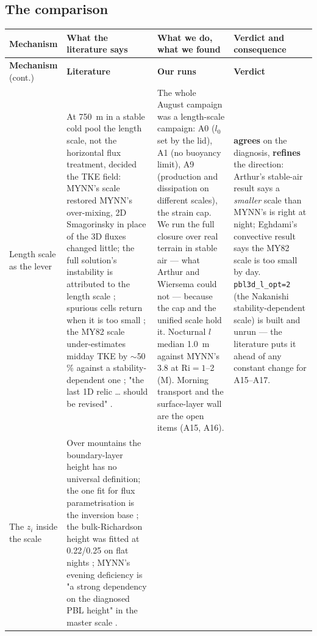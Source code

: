 \documentclass[10pt,a4paper]{article}
\newcommand{\Ri}{\mathrm{Ri}}
\newcommand{\agree}{\textcolor{green!45!black}{\textbf{agrees}}}
\newcommand{\refines}{\textcolor{blue!60!black}{\textbf{refines}}}
\begin{document}
\clearpage
\begin{landscape}
\section*{The comparison}
\scriptsize
\setlength{\tabcolsep}{4pt}
\renewcommand{\arraystretch}{1.1}
\begin{xltabular}{\linewidth}{@{}>{\raggedright\arraybackslash}p{2.2cm}
  >{\raggedright\arraybackslash}X >{\raggedright\arraybackslash}X >{\raggedright\arraybackslash}p{5.0cm}@{}}
\toprule
\textbf{Mechanism} & \textbf{What the literature says} & \textbf{What we do, what we found} & \textbf{Verdict and consequence} \\
\midrule
\endfirsthead
\toprule
\textbf{Mechanism} (cont.) & \textbf{Literature} & \textbf{Our runs} & \textbf{Verdict} \\
\midrule
\endhead
\bottomrule
\endlastfoot
Length scale as the lever &
At 750~m in a stable cold pool the length scale, not the horizontal flux treatment, decided the TKE field: MYNN's scale restored MYNN's over-mixing, 2D Smagorinsky in place of the 3D fluxes changed little; the full solution's instability is attributed to the length scale \parencite{arthur2022}; spurious cells return when it is too small \parencite{haupt2023}; the MY82 scale under-estimates midday TKE by $\sim$50\,\% against a stability-dependent one \parencite{eghdami2022}; "the last 1D relic … should be revised" \parencite{juliano2022}. &
The whole August campaign was a length-scale campaign: A0 ($l_0$ set by the lid), A1 (no buoyancy limit), A9 (production and dissipation on different scales), the strain cap. We run the full closure over real terrain in stable air --- what Arthur and Wiersema could not --- because the cap and the unified scale hold it. Nocturnal $l$ median 1.0~m against MYNN's 3.8 at $\Ri = 1$--2 (M). Morning transport and the surface-layer wall are the open items (A15, A16). &
\agree{} on the diagnosis, \refines{} the direction: Arthur's stable-air result says a \emph{smaller} scale than MYNN's is right at night; Eghdami's convective result says the MY82 scale is too small by day. \texttt{pbl3d\_l\_opt=2} (the Nakanishi stability-dependent scale) is built and unrun --- the literature puts it ahead of any constant change for A15--A17. \\
\addlinespace[3pt]
The $z_i$ inside the scale &
Over mountains the boundary-layer height has no universal definition; the one fit for flux parametrisation is the inversion base \parencite{dewekker2015}; the bulk-Richardson height was fitted at 0.22/0.25 on flat nights \parencite{vogelezang1996}; MYNN's evening deficiency is "a strong dependency on the diagnosed PBL height" in the master scale \parencite{freddi2026}. &

\end{xltabular}
\end{landscape}
\end{document}
